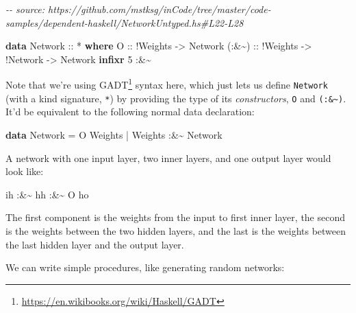 \documentclass[]{article}
\newenvironment{Shaded}{}{}
\newcommand{\CommentTok}[1]{\textcolor[rgb]{0.38,0.63,0.69}{\textit{#1}}}
\newcommand{\DataTypeTok}[1]{\textcolor[rgb]{0.56,0.13,0.00}{#1}}
\newcommand{\DecValTok}[1]{\textcolor[rgb]{0.25,0.63,0.44}{#1}}
\newcommand{\KeywordTok}[1]{\textcolor[rgb]{0.00,0.44,0.13}{\textbf{#1}}}
\newcommand{\NormalTok}[1]{#1}
\newcommand{\OperatorTok}[1]{\textcolor[rgb]{0.40,0.40,0.40}{#1}}
\newcommand{\OtherTok}[1]{\textcolor[rgb]{0.00,0.44,0.13}{#1}}
\renewcommand{\href}[2]{#2\footnote{\url{#1}}}
\begin{document}
\begin{Shaded}
\begin{Highlighting}[]
\CommentTok{{-}{-} source: https://github.com/mstksg/inCode/tree/master/code{-}samples/dependent{-}haskell/NetworkUntyped.hs\#L22{-}L28}

\KeywordTok{data} \DataTypeTok{Network}\OtherTok{ ::} \OperatorTok{*} \KeywordTok{where}
    \DataTypeTok{O}\OtherTok{     ::} \OperatorTok{!}\DataTypeTok{Weights}
          \OtherTok{{-}\textgreater{}} \DataTypeTok{Network}
\OtherTok{    (:\&\textasciitilde{}) ::} \OperatorTok{!}\DataTypeTok{Weights}
          \OtherTok{{-}\textgreater{}} \OperatorTok{!}\DataTypeTok{Network}
          \OtherTok{{-}\textgreater{}} \DataTypeTok{Network}
\KeywordTok{infixr} \DecValTok{5} \OperatorTok{:\&\textasciitilde{}}
\end{Highlighting}
\end{Shaded}

Note that we're using \href{https://en.wikibooks.org/wiki/Haskell/GADT}{GADT}
syntax here, which just lets us define \texttt{Network} (with a kind signature,
\texttt{*}) by providing the type of its \emph{constructors}, \texttt{O} and
\texttt{(:\&\textasciitilde{})}. It'd be equivalent to the following normal data
declaration:

\begin{Shaded}
\begin{Highlighting}[]
\KeywordTok{data} \DataTypeTok{Network} \OtherTok{=} \DataTypeTok{O} \DataTypeTok{Weights}
             \OperatorTok{|} \DataTypeTok{Weights} \OperatorTok{:\&\textasciitilde{}} \DataTypeTok{Network}
\end{Highlighting}
\end{Shaded}

A network with one input layer, two inner layers, and one output layer would
look like:

\begin{Shaded}
\begin{Highlighting}[]
\NormalTok{ih }\OperatorTok{:\&\textasciitilde{}}\NormalTok{ hh }\OperatorTok{:\&\textasciitilde{}} \DataTypeTok{O}\NormalTok{ ho}
\end{Highlighting}
\end{Shaded}

The first component is the weights from the input to first inner layer, the
second is the weights between the two hidden layers, and the last is the weights
between the last hidden layer and the output layer.

We can write simple procedures, like generating random networks:
\end{document}

